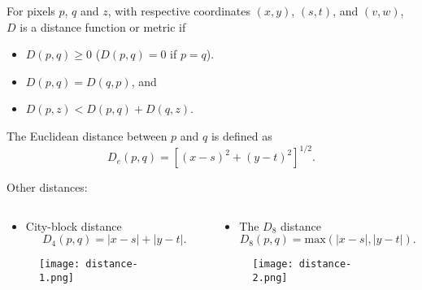 
\begin{frame}
For pixels $p$, $q$ and $z$, with respective coordinates $(x, y)$, $(s, t)$, and $(v, w)$, $D$
is a distance function or metric if
\begin{itemize}
\item $D(p,q) \geq 0$ ($D(p,q) = 0$ if $p=q$).
\item $D(p,q) = D(q,p)$, and
\item $D(p,z) < D(p,q) + D(q,z)$.
\end{itemize}
The Euclidean distance between $p$ and $q$ is defined as
\[
D_{e}(p,q) = \left [ (x-s)^{2} + (y-t)^{2} \right ]^{1/2}.
\]
\end{frame}


\begin{frame}
Other distances:
\begin{columns}
\begin{column}{.5\textwidth}
\begin{itemize}
\item City-block distance
\[
D_{4}(p,q) = |x-s| + |y-t|.
\]
\end{itemize}
\begin{figure}
\centering
\texttt{[image: distance-1.png]}
\end{figure}
\end{column}
\begin{column}{.5\textwidth}
\begin{itemize}
\item The $D_{8}$ distance
\[
D_{8}(p,q) = \text{max}(|x-s|,|y-t|).
\]
\end{itemize}
\begin{figure}
\centering
\texttt{[image: distance-2.png]}
\end{figure}
\end{column}
\end{columns}
\end{frame}



